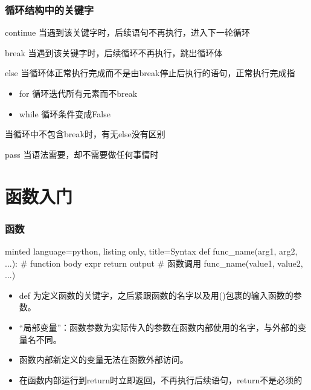 \documentclass[10pt]{beamer}
\begin{document}
\begin{frame}
    \frametitle{循环结构中的关键字}

    \begin{block}{continue}
        当遇到该关键字时，后续语句不再执行，进入下一轮循环
    \end{block}

    \begin{block}{break}
        当遇到该关键字时，后续循环不再执行，跳出循环体
    \end{block}

    \begin{block}{else}
        当循环体正常执行完成而不是由break停止后执行的语句，正常执行完成指
        \begin{itemize}
            \item for 循环迭代所有元素而不break
            \item while 循环条件变成False
        \end{itemize}
        当循环中不包含break时，有无else没有区别
    \end{block}

    \begin{block}{pass}
        当语法需要，却不需要做任何事情时
    \end{block}
    

\end{frame}

\section{函数入门}

\begin{frame}[fragile]
    \frametitle{函数}
    
    \begin{tcblisting}{minted language=python, listing only, title=Syntax}
    def func_name(arg1, arg2, ...):
        # function body
        expr
        return output
    # 函数调用
    func_name(value1, value2, ...)\end{tcblisting}

    \begin{itemize}
        \item def 为定义函数的关键字，之后紧跟函数的名字以及用()包裹的输入函数的参数。
        \item ``局部变量''：函数参数为实际传入的参数在函数内部使用的名字，与外部的变量名不同。
        \item 函数内部新定义的变量无法在函数外部访问。
        \item 在函数内部运行到return时立即返回，不再执行后续语句，return不是必须的
    \end{itemize}

\end{frame}
\end{document}
